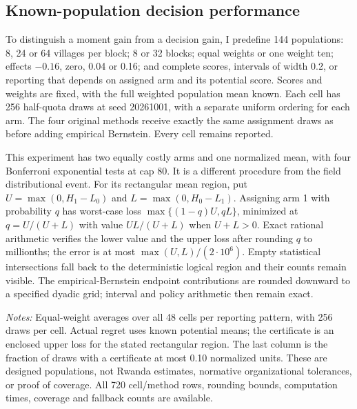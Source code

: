 \documentclass[11pt]{article}
\begin{document}
\subsection{Known-population decision performance}
To distinguish a moment gain from a decision gain, I predefine 144 populations: 8, 24 or 64 villages per block; 8 or 32 blocks; equal weights or one weight ten; effects $-0.16$, zero, 0.04 or 0.16; and complete scores, intervals of width 0.2, or reporting that depends on assigned arm and its potential score. Scores and weights are fixed, with the full weighted population mean known. Each cell has 256 half-quota draws at seed 20261001, with a separate uniform ordering for each arm. The four original methods receive exactly the same assignment draws as before adding empirical Bernstein. Every cell remains reported.

This experiment has two equally costly arms and one normalized mean, with four Bonferroni exponential tests at cap 80. It is a different procedure from the field distributional event. For its rectangular mean region, put $U=\max(0,H_1-L_0)$ and $L=\max(0,H_0-L_1)$. Assigning arm 1 with probability $q$ has worst-case loss $\max\{(1-q)U,qL\}$, minimized at $q=U/(U+L)$ with value $UL/(U+L)$ when $U+L>0$. Exact rational arithmetic verifies the lower value and the upper loss after rounding $q$ to millionths; the error is at most $\max(U,L)/(2\cdot10^6)$. Empty statistical intersections fall back to the deterministic logical region and their counts remain visible. The empirical-Bernstein endpoint contributions are rounded downward to a specified dyadic grid; interval and policy arithmetic then remain exact.

\begin{table}[htbp]
\centering\small\caption{Known-population decision performance across the declared grid}\label{tab:designeddecision}

\begin{minipage}{\textwidth}\footnotesize\emph{Notes:} Equal-weight averages over all 48 cells per reporting pattern, with 256 draws per cell. Actual regret uses known potential means; the certificate is an enclosed upper loss for the stated rectangular region. The last column is the fraction of draws with a certificate at most 0.10 normalized units. These are designed populations, not Rwanda estimates, normative organizational tolerances, or proof of coverage. All 720 cell/method rows, rounding bounds, computation times, coverage and fallback counts are available.\end{minipage}
\end{table}
\end{document}
